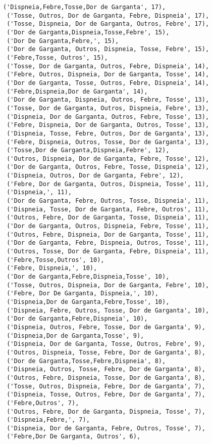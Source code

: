 \documentclass[11pt]{article}
\begin{document}
\begin{tcolorbox}[breakable, size=fbox, boxrule=.5pt, pad at break*=1mm, opacityfill=0]
\begin{Verbatim}[commandchars=\\\{\}]
 ('Dispneia,Febre,Tosse,Dor de Garganta', 17),
 ('Tosse, Outros, Dor de Garganta, Febre, Dispneia', 17),
 ('Tosse, Dispneia, Dor de Garganta, Outros, Febre', 17),
 ('Dor de Garganta,Dispneia,Tosse,Febre', 15),
 ('Dor De Garganta,Febre,', 15),
 ('Dor de Garganta, Outros, Dispneia, Tosse, Febre', 15),
 ('Febre,Tosse, Outros', 15),
 ('Tosse, Dor de Garganta, Outros, Febre, Dispneia', 14),
 ('Febre, Outros, Dispneia, Dor de Garganta, Tosse', 14),
 ('Dor de Garganta, Tosse, Outros, Febre, Dispneia', 14),
 ('Febre,Dispneia,Dor de Garganta', 14),
 ('Dor de Garganta, Dispneia, Outros, Febre, Tosse', 13),
 ('Tosse, Dor de Garganta, Outros, Dispneia, Febre', 13),
 ('Dispneia, Dor de Garganta, Outros, Febre, Tosse', 13),
 ('Febre, Dispneia, Dor de Garganta, Outros, Tosse', 13),
 ('Dispneia, Tosse, Febre, Outros, Dor de Garganta', 13),
 ('Febre, Dispneia, Outros, Tosse, Dor de Garganta', 13),
 ('Tosse,Dor de Garganta,Dispneia,Febre', 12),
 ('Outros, Dispneia, Dor de Garganta, Febre, Tosse', 12),
 ('Dor de Garganta, Outros, Febre, Tosse, Dispneia', 12),
 ('Dispneia, Outros, Dor de Garganta, Febre', 12),
 ('Febre, Dor de Garganta, Outros, Dispneia, Tosse', 11),
 ('Dispneia,', 11),
 ('Dor de Garganta, Febre, Outros, Tosse, Dispneia', 11),
 ('Dispneia, Tosse, Dor de Garganta, Febre, Outros', 11),
 ('Outros, Febre, Dor de Garganta, Tosse, Dispneia', 11),
 ('Dor de Garganta, Outros, Dispneia, Febre, Tosse', 11),
 ('Outros, Febre, Dispneia, Dor de Garganta, Tosse', 11),
 ('Dor de Garganta, Febre, Dispneia, Outros, Tosse', 11),
 ('Outros, Tosse, Dor de Garganta, Febre, Dispneia', 11),
 ('Febre,Tosse,Outros', 10),
 ('Febre, Dispneia,', 10),
 ('Dor de Garganta,Febre,Dispneia,Tosse', 10),
 ('Tosse, Outros, Dispneia, Dor de Garganta, Febre', 10),
 ('Febre, Dor De Garganta, Dispneia,', 10),
 ('Dispneia,Dor de Garganta,Febre,Tosse', 10),
 ('Dispneia, Febre, Outros, Tosse, Dor de Garganta', 10),
 ('Dor de Garganta,Febre,Dispneia', 10),
 ('Dispneia, Outros, Febre, Tosse, Dor de Garganta', 9),
 ('Dispneia,Dor de Garganta,Tosse', 9),
 ('Dispneia, Dor de Garganta, Tosse, Outros, Febre', 9),
 ('Outros, Dispneia, Tosse, Febre, Dor de Garganta', 8),
 ('Dor de Garganta,Tosse,Febre,Dispneia', 8),
 ('Dispneia, Outros, Tosse, Febre, Dor de Garganta', 8),
 ('Outros, Febre, Dispneia, Tosse, Dor de Garganta', 8),
 ('Tosse, Outros, Dispneia, Febre, Dor de Garganta', 7),
 ('Dispneia, Tosse, Outros, Febre, Dor de Garganta', 7),
 ('Febre,Outros', 7),
 ('Outros, Febre, Dor de Garganta, Dispneia, Tosse', 7),
 ('Dispneia,Febre,', 7),
 ('Dispneia, Dor de Garganta, Febre, Outros, Tosse', 7),
 ('Febre,Dor De Garganta, Outros', 6),

\end{Verbatim}
\end{tcolorbox}
\end{document}
